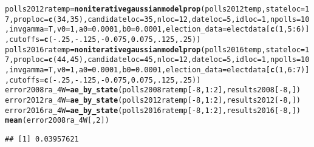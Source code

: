 \documentclass{article}\usepackage[]{graphicx}\usepackage[]{color}
\makeatletter
\newcommand{\hlnum}[1]{\textcolor[rgb]{0.686,0.059,0.569}{#1}}%
\newcommand{\hlopt}[1]{\textcolor[rgb]{0,0,0}{#1}}%
\newcommand{\hlstd}[1]{\textcolor[rgb]{0.345,0.345,0.345}{#1}}%
\newcommand{\hlkwb}[1]{\textcolor[rgb]{0.69,0.353,0.396}{#1}}%
\newcommand{\hlkwc}[1]{\textcolor[rgb]{0.333,0.667,0.333}{#1}}%
\newcommand{\hlkwd}[1]{\textcolor[rgb]{0.737,0.353,0.396}{\textbf{#1}}}%
\newenvironment{kframe}{%
 \def\at@end@of@kframe{}%
 \ifinner\ifhmode%
  \def\at@end@of@kframe{\end{minipage}}%
  \begin{minipage}{\columnwidth}%
 \fi\fi%
 \def\FrameCommand##1{\hskip\@totalleftmargin \hskip-\fboxsep
 \colorbox{shadecolor}{##1}\hskip-\fboxsep
     \hskip-\linewidth \hskip-\@totalleftmargin \hskip\columnwidth}%
 \MakeFramed {\advance\hsize-\width
   \@totalleftmargin\z@ \linewidth\hsize
   \@setminipage}}%
 {\par\unskip\endMakeFramed%
 \at@end@of@kframe}
\newenvironment{knitrout}{}{} %
\makeatother
\begin{document}
\begin{knitrout}
\begin{kframe}
\begin{alltt}
\hlstd{polls2012ratemp} \hlkwb{=} \hlkwd{noniterativegaussianmodelprop}\hlstd{(polls2012temp,} \hlkwc{stateloc} \hlstd{=} \hlnum{17}\hlstd{,} \hlkwc{proploc} \hlstd{=} \hlkwd{c}\hlstd{(}\hlnum{34}\hlstd{,} \hlnum{35}\hlstd{),} \hlkwc{candidateloc} \hlstd{=} \hlnum{35}\hlstd{,}  \hlkwc{nloc} \hlstd{=} \hlnum{12}\hlstd{,} \hlkwc{dateloc} \hlstd{=} \hlnum{5}\hlstd{,} \hlkwc{idloc} \hlstd{=} \hlnum{1}\hlstd{,}  \hlkwc{npolls} \hlstd{=} \hlnum{10}\hlstd{,}\hlkwc{invgamma} \hlstd{= T,} \hlkwc{v0}\hlstd{=}\hlnum{1}\hlstd{,} \hlkwc{a0}\hlstd{=}\hlnum{0.0001}\hlstd{,} \hlkwc{b0}\hlstd{=}\hlnum{0.0001}\hlstd{,}  \hlkwc{election_data} \hlstd{= electdata[}\hlkwd{c}\hlstd{(}\hlnum{1}\hlstd{,} \hlnum{5}\hlopt{:}\hlnum{6}\hlstd{)],} \hlkwc{cutoffs} \hlstd{=} \hlkwd{c}\hlstd{(}\hlopt{-}\hlnum{.25}\hlstd{,} \hlopt{-}\hlnum{.125}\hlstd{,} \hlopt{-}\hlnum{0.075}\hlstd{,} \hlnum{0.075}\hlstd{,} \hlnum{.125}\hlstd{,} \hlnum{.25}\hlstd{))}
\hlstd{polls2016ratemp} \hlkwb{=} \hlkwd{noniterativegaussianmodelprop}\hlstd{(polls2016temp,} \hlkwc{stateloc} \hlstd{=} \hlnum{17}\hlstd{,} \hlkwc{proploc} \hlstd{=} \hlkwd{c}\hlstd{(}\hlnum{44}\hlstd{,} \hlnum{45}\hlstd{),} \hlkwc{candidateloc} \hlstd{=} \hlnum{45}\hlstd{,} \hlkwc{nloc} \hlstd{=} \hlnum{12}\hlstd{,} \hlkwc{dateloc} \hlstd{=} \hlnum{5}\hlstd{,} \hlkwc{idloc} \hlstd{=} \hlnum{1}\hlstd{,}\hlkwc{npolls} \hlstd{=} \hlnum{10}\hlstd{,} \hlkwc{invgamma} \hlstd{= T,} \hlkwc{v0}\hlstd{=}\hlnum{1}\hlstd{,} \hlkwc{a0}\hlstd{=}\hlnum{0.0001}\hlstd{,} \hlkwc{b0}\hlstd{=}\hlnum{0.0001}\hlstd{,} \hlkwc{election_data} \hlstd{= electdata[}\hlkwd{c}\hlstd{(}\hlnum{1}\hlstd{,} \hlnum{6}\hlopt{:}\hlnum{7}\hlstd{)],} \hlkwc{cutoffs} \hlstd{=} \hlkwd{c}\hlstd{(}\hlopt{-}\hlnum{.25}\hlstd{,} \hlopt{-}\hlnum{.125}\hlstd{,} \hlopt{-}\hlnum{0.075}\hlstd{,} \hlnum{0.075}\hlstd{,} \hlnum{.125}\hlstd{,} \hlnum{.25}\hlstd{))}
\hlstd{error2008ra_4W} \hlkwb{=} \hlkwd{ae_by_state}\hlstd{(polls2008ratemp[}\hlopt{-}\hlnum{8}\hlstd{,} \hlnum{1}\hlopt{:}\hlnum{2}\hlstd{], results2008[}\hlopt{-}\hlnum{8}\hlstd{, ])}
\hlstd{error2012ra_4W} \hlkwb{=} \hlkwd{ae_by_state}\hlstd{(polls2012ratemp[}\hlopt{-}\hlnum{8}\hlstd{,} \hlnum{1}\hlopt{:}\hlnum{2}\hlstd{], results2012[}\hlopt{-}\hlnum{8}\hlstd{, ])}
\hlstd{error2016ra_4W} \hlkwb{=} \hlkwd{ae_by_state}\hlstd{(polls2016ratemp[}\hlopt{-}\hlnum{8}\hlstd{,} \hlnum{1}\hlopt{:}\hlnum{2}\hlstd{], results2016[}\hlopt{-}\hlnum{8}\hlstd{, ])}
\hlkwd{mean}\hlstd{(error2008ra_4W[,}\hlnum{2}\hlstd{])}
\end{alltt}
\begin{verbatim}
## [1] 0.03957621

\end{verbatim}
\end{kframe}
\end{knitrout}
\end{document}
